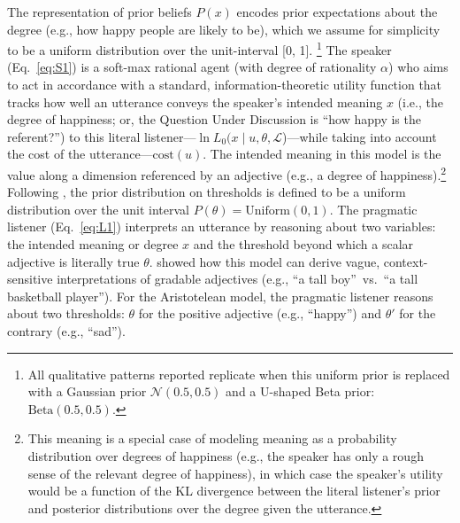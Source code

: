 \documentclass[floatsintext,doc]{apa6}
\let\rmarkdownfootnote\footnote%
\def\footnote{\protect\rmarkdownfootnote}
\begin{document}
The representation of prior beliefs $P(x)$ encodes prior expectations about the degree (e.g., how happy people are likely to be), which we assume for simplicity to be a uniform distribution over the unit-interval [0, 1]. \footnote{All qualitative patterns reported replicate when this uniform prior is replaced with a Gaussian prior $\mathcal{N}(0.5, 0.5)$ and a U-shaped Beta prior: $\text{Beta}(0.5, 0.5)$.
}
The speaker (Eq.~\ref{eq:S1}) is a soft-max rational agent (with degree of rationality  $\alpha$) who aims to act in accordance with a standard, information-theoretic utility function that tracks how well an utterance conveys the speaker's intended meaning $x$ (i.e., the degree of happiness; or, the Question Under Discussion is ``how happy is the referent?'') to this literal listener---$\ln {L_{0}(x \mid u, \theta, \mathcal{L}}$)---while taking into account the cost of the utterance---$\text{cost}(u)$.
The intended meaning in this model is the value along a dimension referenced by an adjective (e.g., a degree of happiness).\footnote{
	This meaning is a special case of modeling meaning as a probability distribution over degrees of happiness (e.g., the speaker has only a rough sense of the relevant degree of happiness), in which case the speaker's utility would be a function of the KL divergence between the literal listener's prior and posterior distributions over the degree given the utterance. 
}
Following , the prior distribution on thresholds is defined to be a uniform distribution over the unit interval $P(\theta) = \text{Uniform}(0, 1)$. 
The pragmatic listener (Eq.~\ref{eq:L1}) interprets an utterance by reasoning about two variables: the intended meaning or degree $x$ and the threshold beyond which a scalar adjective is literally true  $\theta$. 
  showed how this model can derive vague, context-sensitive interpretations of gradable adjectives (e.g., ``a tall boy''~vs.~``a tall basketball player'').
For the Aristotelean model, the pragmatic listener reasons about two thresholds: $\theta$ for the positive adjective (e.g., ``happy'') and $\theta'$ for the contrary (e.g., ``sad'').


\end{document}
